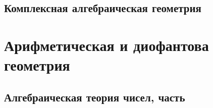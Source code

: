 \documentclass[dvipsnames, 11pt]{book}
\begin{document}
    \newpage
    \section{Комплексная алгебраическая геометрия}
    
    
    
    

    \newpage

    \chapter{Арифметическая и диофантова геометрия}

    \section{Алгебраическая теория чисел, часть }

    
    
    
    
    
    
    
    
    
    
    
    
    
    
\end{document}
